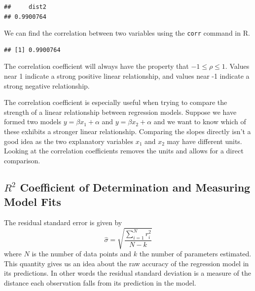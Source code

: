 \documentclass[
]{book}
\newenvironment{Shaded}{\begin{snugshade}}{\end{snugshade}}
\newcommand{\FunctionTok}[1]{\textcolor[rgb]{0.00,0.00,0.00}{#1}}
\newcommand{\NormalTok}[1]{#1}
\newcommand{\SpecialCharTok}[1]{\textcolor[rgb]{0.00,0.00,0.00}{#1}}
\theoremstyle{definition}
\theoremstyle{definition}
\theoremstyle{definition}
\theoremstyle{definition}
\theoremstyle{remark}
\begin{document}
\begin{verbatim}
##     dist2 
## 0.9900764
\end{verbatim}

We can find the correlation between two variables using the \texttt{corr} command in R.

\begin{Shaded}
\end{Shaded}

\begin{verbatim}
## [1] 0.9900764
\end{verbatim}

The correlation coefficient will always have the property that \(-1 \leq \rho \leq 1\). Values near 1 indicate a strong positive linear relationship, and values near -1 indicate a strong negative relationship.

The correlation coefficient is especially useful when trying to compare the strength of a linear relationship between regression models. Suppose we have formed two models \(y=\beta x_1+\alpha\) and \(y=\beta x_2+\alpha\) and we want to know which of these exhibits a stronger linear relationship. Comparing the slopes directly isn't a good idea as the two explanatory variables \(x_1\) and \(x_2\) may have different units. Looking at the correlation coefficients removes the units and allows for a direct comparison.

\hypertarget{r2-coefficient-of-determination-and-measuring-model-fits}{%
\subsection{\texorpdfstring{\(R^2\) Coefficient of Determination and Measuring Model Fits}{R\^{}2 Coefficient of Determination and Measuring Model Fits}}\label{r2-coefficient-of-determination-and-measuring-model-fits}}

The residual standard error is given by \[\hat{\sigma}=\sqrt{\frac{\sum_{i=1}^N r_i^2}{N-k}}\] where \(N\) is the number of data points and \(k\) the number of parameters estimated. This quantity gives us an idea about the raw accuracy of the regression model in its predictions. In other words the residual standard deviation is a measure of the distance each observation falls from its prediction in the model.
\end{document}
